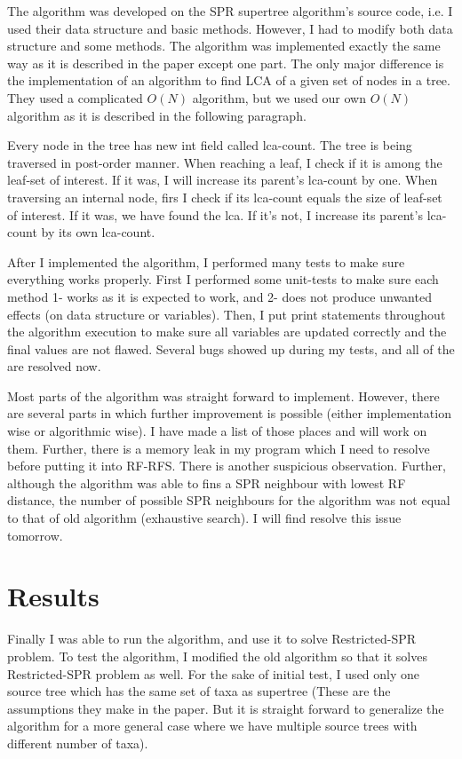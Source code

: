 \documentclass[12pt]{article}
\begin{document}
The algorithm was developed on the SPR supertree algorithm's source code, i.e. I used their data structure and basic methods. However, I had to modify both data structure and some methods. The algorithm was implemented exactly the same way as it is described in the paper except one part. The only major difference is the implementation of an algorithm to find LCA of a given set of nodes in a tree. They used a complicated $O(N)$ algorithm, but we used our own $O(N)$ algorithm as it is described in the following paragraph. 

Every node in the tree has new int field called lca-count. The tree is being traversed in post-order manner. When reaching a leaf, I check if it is among the leaf-set of interest. If it was, I will increase its parent's lca-count by one. When traversing an internal node, firs I check if its lca-count equals the size of leaf-set of interest. If it was, we have found the lca. If it's not, I increase its parent's lca-count by its own lca-count.

After I implemented the algorithm, I performed many tests to make sure everything works properly. First I performed some unit-tests to make sure each method 1- works as it is expected to work, and 2- does not produce unwanted effects (on data structure or variables). Then, I put print statements throughout the algorithm execution to make sure all variables are updated correctly and the final values are not flawed. Several bugs showed up during my tests, and all of the are resolved now.

Most parts of the algorithm was straight forward to implement. However, there are  several parts in which further improvement is possible (either implementation wise or algorithmic wise). I have made a list of those places and will work on them. Further, there is a memory leak in my program which I need to resolve before putting it into RF-RFS. There is another suspicious observation. Further, although the algorithm was able to fins a SPR neighbour with lowest RF distance, the number of possible SPR neighbours for the algorithm was not equal to that of old algorithm (exhaustive search). I will find resolve this issue tomorrow.  

\section{Results}\label{results}
Finally I was able to run the algorithm, and use it to solve Restricted-SPR problem. To test the algorithm, I modified the old algorithm so that it solves Restricted-SPR problem as well. For the sake of initial test, I used only one source tree which has the same set of taxa as supertree (These are the assumptions they make in the paper. But it is straight forward to generalize the algorithm for a more general case where we have multiple source trees with different number of taxa). 
\end{document}
